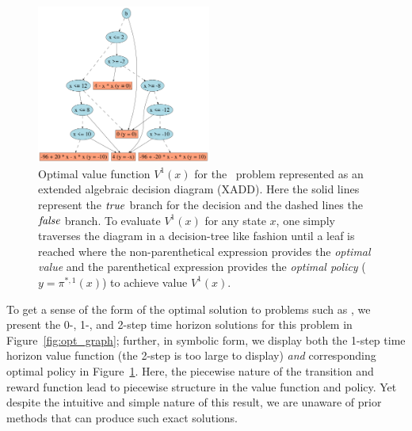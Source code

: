 \begin{figure}[t!]
\hspace{-1mm}\includegraphics[width=0.51\textwidth]{Figures1/v2_mr_dd.pdf}
\caption{\footnotesize Optimal value function $V^1(x)$ for the
\MarsRover\ problem represented as an extended algebraic decision
diagram (XADD).  Here the solid lines represent the $\mathit{true}$ branch for
the decision and the dashed lines the $\mathit{false}$ branch.  To evaluate
$V^1(x)$ for any state $x$, one simply traverses the diagram in a
decision-tree like fashion until a leaf is reached where the
non-parenthetical expression provides the \emph{optimal value} and the
parenthetical expression provides the \emph{optimal policy} 
($y = \pi^{*,1}(x)$) to achieve value $V^1(x)$.}
\label{fig:opt_val_pol}
\end{figure}

To get a sense of the form of the optimal solution to problems such as
\MarsRover, we present the 0-, 1-, and 2-step time horizon solutions
for this problem in Figure~\ref{fig:opt_graph}; further, in symbolic
form, we display both the 1-step time horizon value function (the
2-step is too large to display) \emph{and} corresponding optimal
policy in Figure~\ref{fig:opt_val_pol}.  Here, the piecewise nature of
the transition and reward function lead to piecewise
structure in the value function and policy.  Yet despite the intuitive and
simple nature of this result, we are unaware of prior methods that can
produce such exact solutions.

